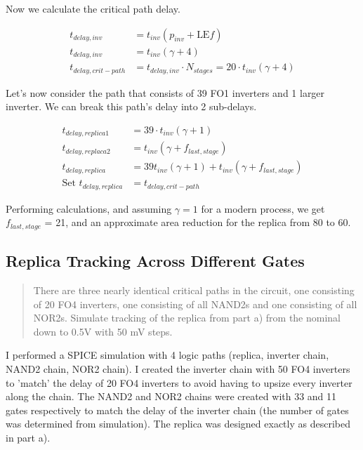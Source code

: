 \documentclass[11pt]{article}
\begin{document}
Now we calculate the critical path delay.

\begin{align}
	t_{delay,inv} &= t_{inv}(p_{inv} + \text{LE} f) \nonumber \\
	t_{delay,inv} &= t_{inv}(\gamma + 4) \nonumber \\
	t_{delay,crit-path} &= t_{delay,inv}  \cdot N_{stages} = 20 \cdot t_{inv}(\gamma + 4) \nonumber
\end{align}

Let's now consider the path that consists of 39 FO1 inverters and 1 larger inverter. We can break this path's delay into 2 sub-delays.

\begin{align}
	t_{delay,replica1} &= 39 \cdot t_{inv}(\gamma + 1) \nonumber \\
	t_{delay,replaca2} &= t_{inv}(\gamma + f_{last,stage}) \nonumber \\
	t_{delay,replica} &= 39 t_{inv}(\gamma + 1) + t_{inv}(\gamma + f_{last,stage}) \nonumber \\
	\text{Set } t_{delay,replica} &= t_{delay,crit-path} \nonumber 
\end{align}

Performing calculations, and assuming $\gamma = 1$ for a modern process, we get $f_{last,stage}$ = 21, and an approximate area reduction for the replica from 80 to 60.

\subsection{Replica Tracking Across Different Gates}
\begin{quote}
	There are three nearly identical critical paths in the circuit, one consisting of 20 FO4 inverters, one consisting of all NAND2s and one consisting of all NOR2s. Simulate tracking of the replica from part a) from the nominal down to 0.5V with 50 mV steps.
\end{quote}

I performed a SPICE simulation with 4 logic paths (replica, inverter chain, NAND2 chain, NOR2 chain). I created the inverter chain with 50 FO4 inverters to 'match' the delay of 20 FO4 inverters to avoid having to upsize every inverter along the chain. The NAND2 and NOR2 chains were created with 33 and 11 gates respectively to match the delay of the inverter chain (the number of gates was determined from simulation). The replica was designed exactly as described in part a).
\end{document}
